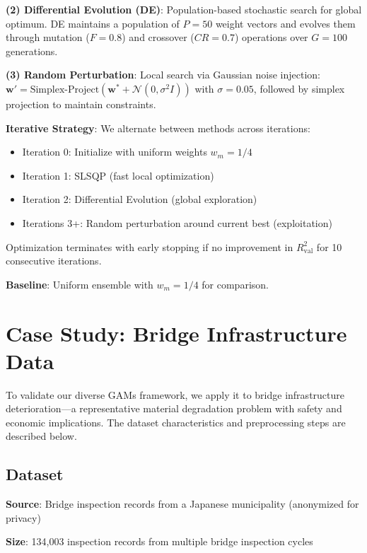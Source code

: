 \documentclass[twocolumn]{article}
\begin{document}
\textbf{(2) Differential Evolution (DE)}: Population-based stochastic search for global optimum. DE maintains a population of $P=50$ weight vectors and evolves them through mutation ($F=0.8$) and crossover ($CR=0.7$) operations over $G=100$ generations.

\textbf{(3) Random Perturbation}: Local search via Gaussian noise injection: $\mathbf{w}' = \text{Simplex-Project}(\mathbf{w}^* + \mathcal{N}(0, \sigma^2 I))$ with $\sigma=0.05$, followed by simplex projection to maintain constraints.

\textbf{Iterative Strategy}: We alternate between methods across iterations:
\begin{itemize}
\item Iteration 0: Initialize with uniform weights $w_m = 1/4$
\item Iteration 1: SLSQP (fast local optimization)
\item Iteration 2: Differential Evolution (global exploration)
\item Iterations 3+: Random perturbation around current best (exploitation)
\end{itemize}
Optimization terminates with early stopping if no improvement in $R^2_{\text{val}}$ for 10 consecutive iterations.

\textbf{Baseline}: Uniform ensemble with $w_m = 1/4$ for comparison.

\section{Case Study: Bridge Infrastructure Data}
\label{sec:data}

To validate our diverse GAMs framework, we apply it to bridge infrastructure deterioration—a representative material degradation problem with safety and economic implications. The dataset characteristics and preprocessing steps are described below.

\subsection{Dataset}

\textbf{Source}: Bridge inspection records from a Japanese municipality (anonymized for privacy)

\textbf{Size}: 134,003 inspection records from multiple bridge inspection cycles
\end{document}
